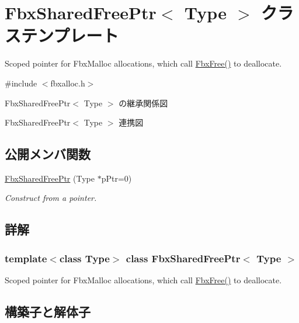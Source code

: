 \hypertarget{class_fbx_shared_free_ptr}{}\section{Fbx\+Shared\+Free\+Ptr$<$ Type $>$ クラステンプレート}
\label{class_fbx_shared_free_ptr}


Scoped pointer for Fbx\+Malloc allocations, which call \hyperlink{fbxalloc_8h_a8252906713d55f4c56e7ba84221d3852}{Fbx\+Free()} to deallocate.  




{\ttfamily \#include $<$fbxalloc.\+h$>$}



Fbx\+Shared\+Free\+Ptr$<$ Type $>$ の継承関係図


Fbx\+Shared\+Free\+Ptr$<$ Type $>$ 連携図
\subsection*{公開メンバ関数}
\begin{DoxyCompactItemize}
\item 
\hyperlink{class_fbx_shared_free_ptr_aed52ec1d3edb3564059995172aaf1de8}{Fbx\+Shared\+Free\+Ptr} (Type $\ast$p\+Ptr=0)
\begin{DoxyCompactList}\small\item\em Construct from a pointer. \end{DoxyCompactList}\end{DoxyCompactItemize}


\subsection{詳解}
\subsubsection*{template$<$class Type$>$\newline
class Fbx\+Shared\+Free\+Ptr$<$ Type $>$}

Scoped pointer for Fbx\+Malloc allocations, which call \hyperlink{fbxalloc_8h_a8252906713d55f4c56e7ba84221d3852}{Fbx\+Free()} to deallocate. 

\subsection{構築子と解体子}
\mbox{\label{class_fbx_shared_free_ptr_aed52ec1d3edb3564059995172aaf1de8}} 
